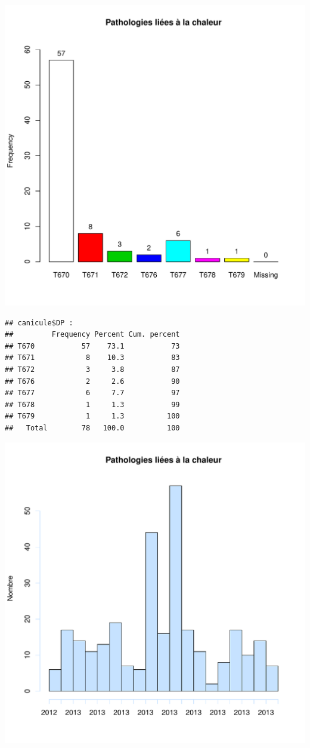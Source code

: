 \documentclass[12pt,english,french,twoside]{book}\usepackage[]{graphicx}\usepackage[]{color}
\makeatletter
\def\maxwidth{ %
  \ifdim\Gin@nat@width>\linewidth
    \linewidth
  \else
    \Gin@nat@width
  \fi
}
\newenvironment{kframe}{%
 \def\at@end@of@kframe{}%
 \ifinner\ifhmode%
  \def\at@end@of@kframe{\end{minipage}}%
  \begin{minipage}{\columnwidth}%
 \fi\fi%
 \def\FrameCommand##1{\hskip\@totalleftmargin \hskip-\fboxsep
 \colorbox{shadecolor}{##1}\hskip-\fboxsep
     \hskip-\linewidth \hskip-\@totalleftmargin \hskip\columnwidth}%
 \MakeFramed {\advance\hsize-\width
   \@totalleftmargin\z@ \linewidth\hsize
   \@setminipage}}%
 {\par\unskip\endMakeFramed%
 \at@end@of@kframe}
\newenvironment{knitrout}{}{} %
\makeatother
\begin{document}
\begin{knitrout}
\includegraphics[width=\maxwidth]{figure/canicule2} 
\begin{kframe}\begin{verbatim}
## canicule$DP :  
##         Frequency Percent Cum. percent
## T670           57    73.1           73
## T671            8    10.3           83
## T672            3     3.8           87
## T676            2     2.6           90
## T677            6     7.7           97
## T678            1     1.3           99
## T679            1     1.3          100
##   Total        78   100.0          100
\end{verbatim}
\end{kframe}
\includegraphics[width=\maxwidth]{figure/canicule3} 

\end{knitrout}
\end{document}
